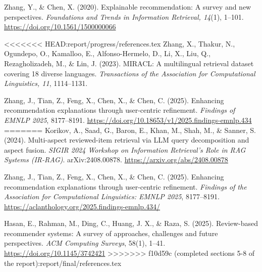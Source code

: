 Zhang, Y., \& Chen, X. (2020). Explainable recommendation: A survey and new perspectives.
\emph{Foundations and Trends in Information Retrieval, 14}(1), 1--101.
\url{https://doi.org/10.1561/1500000066}

<<<<<<< HEAD:report/progress/references.tex
Zhang, X., Thakur, N., Ogundepo, O., Kamalloo, E., Alfonso-Hermelo, D., Li, X., Liu, Q.,
Rezagholizadeh, M., \& Lin, J. (2023). MIRACL: A multilingual retrieval dataset covering 18
diverse languages. \emph{Transactions of the Association for Computational Linguistics, 11},
1114--1131.

Zhang, J., Tian, Z., Feng, X., Chen, X., \& Chen, C. (2025). Enhancing recommendation
explanations through user-centric refinement. \emph{Findings of EMNLP 2025}, 8177--8191.
\url{https://doi.org/10.18653/v1/2025.findings-emnlp.434}
=======
Korikov, A., Saad, G., Baron, E., Khan, M., Shah, M., \& Sanner, S. (2024).
Multi-aspect reviewed-item retrieval via LLM query decomposition and aspect fusion.
\emph{SIGIR 2024 Workshop on Information Retrieval's Role in RAG Systems (IR-RAG)}.
arXiv:2408.00878. \url{https://arxiv.org/abs/2408.00878}

Zhang, J., Tian, Z., Feng, X., Chen, X., \& Chen, C. (2025).
Enhancing recommendation explanations through user-centric refinement.
\emph{Findings of the Association for Computational Linguistics: EMNLP 2025}, 8177--8191.
\url{https://aclanthology.org/2025.findings-emnlp.434/}

Hasan, E., Rahman, M., Ding, C., Huang, J. X., \& Raza, S. (2025).
Review-based recommender systems: A survey of approaches, challenges and future perspectives.
\emph{ACM Computing Surveys}, 58(1), 1--41.
\url{https://doi.org/10.1145/3742421}
>>>>>>> f10d59c (completed sections 5-8 of the report):report/final/references.tex
